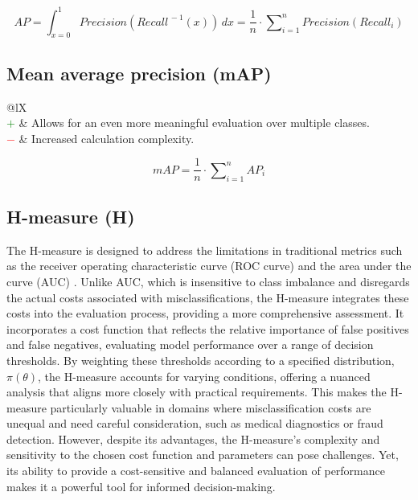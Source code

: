 \documentclass{article}
\begin{document}
\begin{equation}
    \textit{AP} = \int_{x = 0}^1 \textit{Precision}(\textit{Recall}^{\,-1}(x)) \,dx = \dfrac{1}{n} \cdot \sum\nolimits_{i = 1}^n \textit{Precision}(\textit{Recall}_i)
%
    \label{equation:AP}
\end{equation}


\subsection[Mean average precision (mAP)]{Mean average precision (mAP) \cite{manning2009introduction, everingham2010pascal}}

\begin{table}[H]\centering
    \begin{tabularx}{\textwidth}{@{}lX}
         \\
        \textcolor{Green}{$+$} & Allows for an even more meaningful evaluation over multiple classes. \\
        \textcolor{Red}{$-$}   & Increased calculation complexity.
    \end{tabularx}
\end{table}

\begin{equation}
    \textit{mAP} = \dfrac{1}{n} \cdot \sum\nolimits_{i = 1}^n \textit{AP}_i
%
    \label{equation:mAP}
\end{equation}


\subsection[H-measure (H)]{H-measure (H) \cite{hand2009measuring, hand2023notes}}

The H-measure \cite{hand2009measuring, hand2023notes} is designed to address the limitations in traditional metrics such as the receiver operating characteristic curve (ROC curve) and the area under the curve (AUC) \cite{hilden1991area, hand2010evaluating}. Unlike AUC, which is insensitive to class imbalance and disregards the actual costs associated with misclassifications, the H-measure integrates these costs into the evaluation process, providing a more comprehensive assessment. It incorporates a cost function that reflects the relative importance of false positives and false negatives, evaluating model performance over a range of decision thresholds. By weighting these thresholds according to a specified distribution, $\pi(\theta)$, the H-measure accounts for varying conditions, offering a nuanced analysis that aligns more closely with practical requirements. This makes the H-measure particularly valuable in domains where misclassification costs are unequal and need careful consideration, such as medical diagnostics or fraud detection. However, despite its advantages, the H-measure's complexity and sensitivity to the chosen cost function and parameters can pose challenges. Yet, its ability to provide a cost-sensitive and balanced evaluation of performance makes it a powerful tool for informed decision-making.
\end{document}
